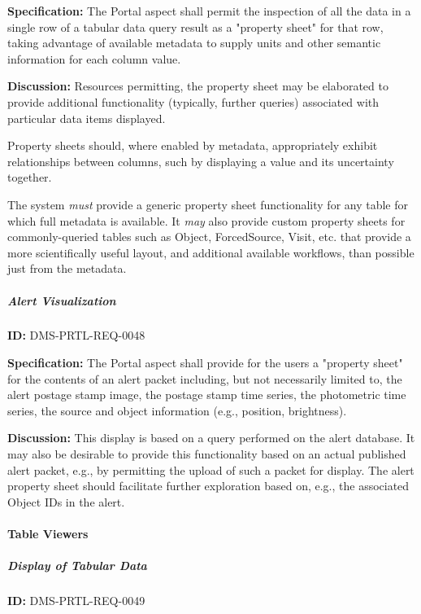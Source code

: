 \documentclass[SE,toc,lsstdraft]{lsstdoc}
\begin{document}
\textbf{Specification:}
The Portal aspect shall permit the inspection of all the data in a single row of a tabular data query result as a "property sheet" for that row, taking advantage of available metadata to supply units and other semantic information for each column value.

\textbf{Discussion:}
Resources permitting, the property sheet may be elaborated to provide additional functionality (typically, further queries) associated with particular data items displayed.

Property sheets should, where enabled by metadata, appropriately exhibit relationships between columns, such by displaying a value and its uncertainty together.

The system \textit{must} provide a generic property sheet functionality for any table for which full metadata is available. It \textit{may} also provide custom property sheets for commonly-queried tables such as Object, ForcedSource, Visit, etc. that provide a more scientifically useful layout, and additional available workflows, than possible just from the metadata.

\subparagraph{Alert Visualization}\hfill  %

\label{DMS-PRTL-REQ-0048}
\textbf{ID:} DMS-PRTL-REQ-0048

\textbf{Specification:}
The Portal aspect shall provide for the users a "property sheet" for the contents of an alert packet including, but not necessarily limited to, the alert postage stamp image, the postage stamp time series, the photometric time series, the source and object information (e.g., position, brightness).

\textbf{Discussion:}
This display is based on a query performed on the alert database.  It may also be desirable to provide this functionality based on an actual published alert packet, e.g., by permitting the upload of such a packet for display.
The alert property sheet should facilitate further exploration based on, e.g., the associated Object IDs in the alert.

\paragraph{Table Viewers}\hfill  %

\subparagraph{Display of Tabular Data}\hfill  %

\label{DMS-PRTL-REQ-0049}
\textbf{ID:} DMS-PRTL-REQ-0049
\end{document}
